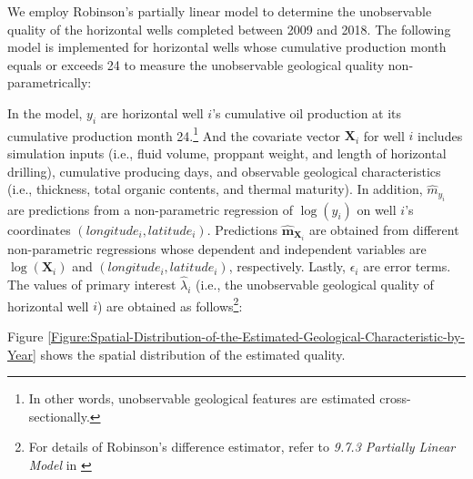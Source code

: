 We employ Robinson's partially linear model to determine the unobservable quality of the horizontal wells completed between 2009 and 2018. The following model is implemented for horizontal wells whose cumulative production month equals or exceeds 24 to measure the unobservable geological quality non-parametrically:

In the model, $ y_{i}$ are horizontal well $i$'s cumulative oil production at its cumulative production month 24.\footnote{In other words, unobservable geological features are estimated cross-sectionally.} And the covariate vector $\boldsymbol{X}_{i}$ for well $i$ includes simulation inputs (i.e., fluid volume, proppant weight, and length of horizontal drilling), cumulative producing days, and observable geological characteristics (i.e., thickness, total organic contents, and thermal maturity). In addition, $\widehat{m}_{y_{i}}$ are predictions from a non-parametric regression of $\log \left( y_{i} \right)$ on well $i$'s coordinates $(longitude_{i}, latitude_{i})$. Predictions $\widehat{\boldsymbol{m}}_{\boldsymbol{X}_{i}}$ are obtained from different non-parametric regressions whose dependent and independent variables are $\log \left( \boldsymbol{X}_{i} \right)$ and $(longitude_{i}, latitude_{i})$, respectively. Lastly, $\epsilon_{i}$ are error terms. The values of primary interest $\widehat{\lambda}_{i}$ (i.e., the unobservable geological quality of horizontal well $i$) are obtained as follows\footnote{For details of Robinson's difference estimator, refer to \textit{9.7.3 Partially Linear Model} in \cite{MicroEconometrics-Methods-and-Applications_Cameron-and-Trivedi_2005}}:

Figure \ref{Figure:Spatial-Distribution-of-the-Estimated-Geological-Characteristic-by-Year} shows the spatial distribution of the estimated quality. 
